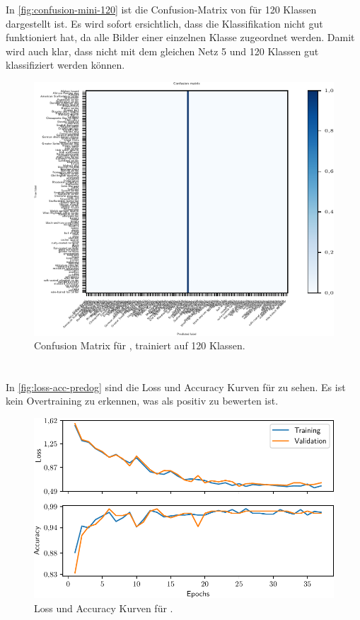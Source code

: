 In \autoref{fig:confusion-mini-120} ist die Confusion-Matrix von \MiniDog für
120 Klassen dargestellt ist. Es wird sofort ersichtlich, dass die Klassifikation
nicht gut funktioniert hat, da alle Bilder einer einzelnen Klasse zugeordnet
werden. Damit wird auch klar, dass nicht mit dem gleichen Netz 5 und 120 Klassen
gut klassifiziert werden können.

\begin{figure}
  \centering
  \includegraphics{pics/ergebnisse/MiniDogNN/confusion_matrix_mini120.pdf}
  \caption{Confusion Matrix für \MiniDog, trainiert auf 120 Klassen.}
  \label{fig:confusion-mini-120}
\end{figure}

\section{\PreDog}

In \autoref{fig:loss-acc-predog} sind die Loss und Accuracy Kurven für \PreDog zu sehen.
Es ist kein Overtraining zu erkennen, was als positiv zu bewerten ist.

\begin{figure}
  \centering
  \includegraphics[scale=0.8]{pics/ergebnisse/PreDogNN/history_epoch.pdf}
  \caption{Loss und Accuracy Kurven für \PreDog.}
  \label{fig:loss-acc-predog}
\end{figure}

